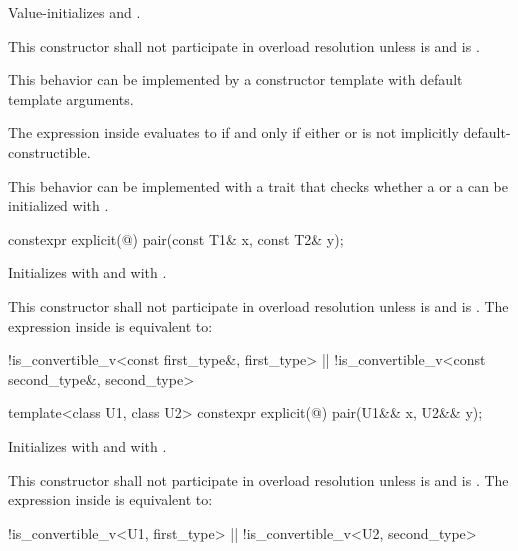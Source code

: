 \begin{itemdescr}
\pnum
\effects
Value-initializes  and .

\pnum
\remarks
This constructor shall not participate in overload resolution unless
 is  and
 is .
\begin{note} This behavior can be implemented by a constructor template
with default template arguments. \end{note}
The expression inside  evaluates to 
if and only if either  or
 is not implicitly default-constructible.
\begin{note} This behavior can be implemented with a trait that checks
whether a  or a 
can be initialized with \tcode{\{\}}. \end{note}
\end{itemdescr}

%
\begin{itemdecl}
constexpr explicit(@\seebelow@) pair(const T1& x, const T2& y);
\end{itemdecl}

\begin{itemdescr}
\pnum
\effects
Initializes  with  and  with .

\pnum
\remarks This constructor shall not participate in overload resolution
unless  is  and
 is .
The expression inside  is equivalent to:
\begin{codeblock}
!is_convertible_v<const first_type&, first_type> ||
  !is_convertible_v<const second_type&, second_type>
\end{codeblock}
\end{itemdescr}

%
\begin{itemdecl}
template<class U1, class U2> constexpr explicit(@\seebelow@) pair(U1&& x, U2&& y);
\end{itemdecl}

\begin{itemdescr}
\pnum
\effects
Initializes  with
 and 
with .

\pnum
\remarks
This constructor shall not participate in overload resolution unless
 is  and
 is .
The expression inside  is equivalent to:
\begin{codeblock}
!is_convertible_v<U1, first_type> || !is_convertible_v<U2, second_type>
\end{codeblock}
\end{itemdescr}

